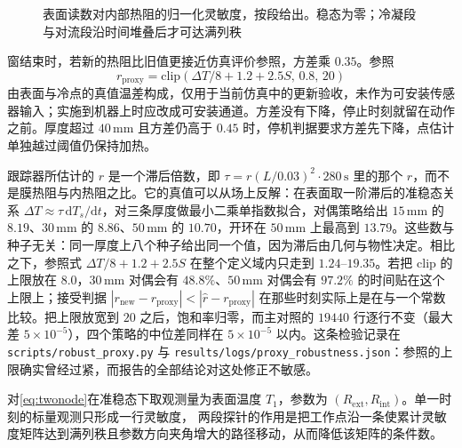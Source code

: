 \begin{figure}[htbp]
\centering
{}
\caption{表面读数对内部热阻的归一化灵敏度，按段给出。稳态为零；冷凝段与对流段沿时间堆叠后才可达满列秩}
\label{fig:probesens}
\end{figure}

窗结束时，若新的热阻比旧值更接近仿真评价参照，方差乘 \(0.35\)。参照
\[
r_{\mathrm{proxy}}=\mathrm{clip}(\Delta T/8+1.2+2.5 S,\,0.8,\,20)
\]
由表面与冷点的真值温差构成，仅用于当前仿真中的更新验收，未作为可安装传感器输入；实施到机器上时应改成可安装通道。方差没有下降，停止时刻就留在动作之前。厚度超过 \(40\,\mathrm{mm}\) 且方差仍高于 \(0.45\) 时，停机判据要求方差先下降，点估计单独越过阈值仍保持加热。

跟踪器所估计的 \(r\) 是一个滞后倍数，即 \(\tau=r(L/0.03)^2\cdot 280\,\mathrm{s}\) 里的那个 \(r\)，而不是膜热阻与内热阻之比。它的真值可以从场上反解：在表面取一阶滞后的准稳态关系 \(\Delta T\approx\tau\,\mathrm{d}T_s/\mathrm{d}t\)，对三条厚度做最小二乘单指数拟合，对偶策略给出 \(15\,\mathrm{mm}\) 的 \(8.19\)、\(30\,\mathrm{mm}\) 的 \(8.86\)、\(50\,\mathrm{mm}\) 的 \(10.70\)，开环在 \(50\,\mathrm{mm}\) 上最高到 \(13.79\)。这些数与种子无关：同一厚度上八个种子给出同一个值，因为滞后由几何与物性决定。相比之下，参照式 \(\Delta T/8+1.2+2.5S\) 在整个定义域内只走到 \(1.24\)--\(19.35\)。若把 \(\mathrm{clip}\) 的上限放在 \(8.0\)，\(30\,\mathrm{mm}\) 对偶会有 \(48.8\%\)、\(50\,\mathrm{mm}\) 对偶会有 \(97.2\%\) 的时间贴在这个上限上；接受判据 \(|r_{\mathrm{new}}-r_{\mathrm{proxy}}|<|\hat r-r_{\mathrm{proxy}}|\) 在那些时刻实际上是在与一个常数比较。把上限放宽到 \(20\) 之后，饱和率归零，而主对照的 \(19440\) 行逐行不变（最大差 \(5\times10^{-5}\)），四个策略的中位差同样在 \(5\times10^{-5}\) 以内。这条检验记录在 \texttt{scripts/robust\_proxy.py} 与 \texttt{results/logs/proxy\_robustness.json}：参照的上限确实曾经过紧，而报告的全部结论对这处修正不敏感。

\begin{proposition}[两段探针改善累计灵敏度的条件数]
\label{prop:pulse}
对\eqref{eq:twonode}在准稳态下取观测量为表面温度 \(T_1\)，参数为
\((R_{\mathrm{ext}},R_{\mathrm{int}})\)。单一时刻的标量观测只形成一行灵敏度，
两段探针的作用是把工作点沿一条使累计灵敏度矩阵达到满列秩且参数方向夹角增大的路径移动，从而降低该矩阵的条件数。
\end{proposition}

